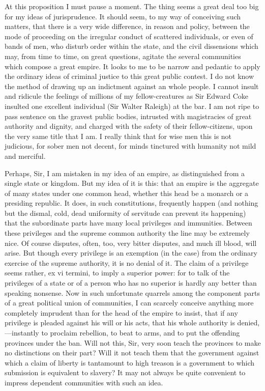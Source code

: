 At this proposition I must pause a moment. The thing seems a great deal too big for my ideas of jurisprudence. It should seem, to my way of conceiving such matters, that there is a very wide difference, in reason and policy, between the mode of proceeding on the irregular conduct of scattered individuals, or even of bands of men, who disturb order within the state, and the civil dissensions which may, from time to time, on great questions, agitate the several communities which compose a great empire. It looks to me to be narrow and pedantic to apply the ordinary ideas of criminal justice to this great public contest. I do not know the method of drawing up an indictment against an whole people. I cannot insult and ridicule the feelings of millions of my fellow-creatures as Sir Edward Coke insulted one excellent individual (Sir Walter Raleigh) at the bar. I am not ripe to pass sentence on the gravest public bodies, intrusted with magistracies of great authority and dignity, and charged with the safety of their fellow-citizens, upon the very same title that I am. I really think that for wise men this is not judicious, for sober men not decent, for minds tinctured with humanity not mild and merciful.

Perhaps, Sir, I am mistaken in my idea of an empire, as distinguished from a single state or kingdom. But my idea of it is this: that an empire is the aggregate of many states under one common head, whether this head be a monarch or a presiding republic. It does, in such constitutions, frequently happen (and nothing but the dismal, cold, dead uniformity of servitude can prevent its happening) that the subordinate parts have many local privileges and immunities. Between these privileges and the supreme common authority the line may be extremely nice. Of course disputes, often, too, very bitter disputes, and much ill blood, will arise. But though every privilege is an exemption (in the case) from the ordinary exercise of the supreme authority, it is no denial of it. The claim of a privilege seems rather, ex vi termini, to imply a superior power: for to talk of the privileges of a state or of a person who has no superior is hardly any better than speaking nonsense. Now in such unfortunate quarrels among the component parts of a great political union of communities, I can scarcely conceive anything more completely imprudent than for the head of the empire to insist, that if any privilege is pleaded against his will or his acts, that his whole authority is denied,—instantly to proclaim rebellion, to beat to arms, and to put the offending provinces under the ban. Will not this, Sir, very soon teach the provinces to make no distinctions on their part? Will it not teach them that the government against which a claim of liberty is tantamount to high treason is a government to which submission is equivalent to slavery? It may not always be quite convenient to impress dependent communities with such an idea.

